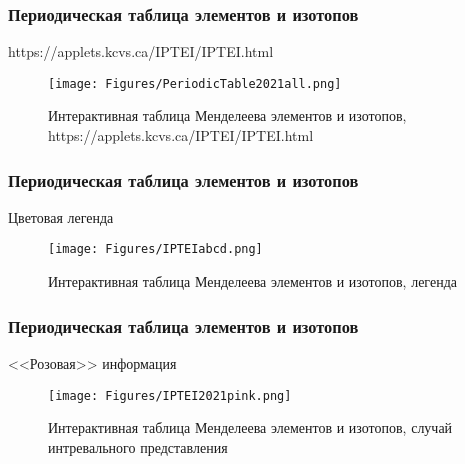 \begin{frame}
	

	
	
\end{frame}

\begin{frame}
	\frametitle{Периодическая таблица элементов и изотопов}
	
https://applets.kcvs.ca/IPTEI/IPTEI.html

\begin{figure}[ht] 
	\centering\small
	\unitlength=1mm
	\texttt{[image: Figures/PeriodicTable2021all.png]}
	\caption{Интерактивная таблица Менделеева элементов и изотопов, https://applets.kcvs.ca/IPTEI/IPTEI.html} 
	\label{f:PeriodicTable}
\end{figure}	
	
\end{frame}

\begin{frame}
\frametitle{Периодическая таблица элементов и изотопов}

Цветовая легенда

\begin{figure}[ht] 
	\centering\small
	\unitlength=1mm
	\texttt{[image: Figures/IPTEIabcd.png]}
	\caption{Интерактивная таблица Менделеева элементов и изотопов, легенда} 
	\label{f:IPTEIabcd}
\end{figure}	

\end{frame}

\begin{frame}
\frametitle{Периодическая таблица элементов и изотопов}

<<Розовая>> информация

\begin{figure}[ht] 
	\centering\small
	\unitlength=1mm
	\texttt{[image: Figures/IPTEI2021pink.png]}
	\caption{Интерактивная таблица Менделеева элементов и изотопов, случай интревального представления} 
	\label{f:IPTEI2021pink}
\end{figure}	

\end{frame}